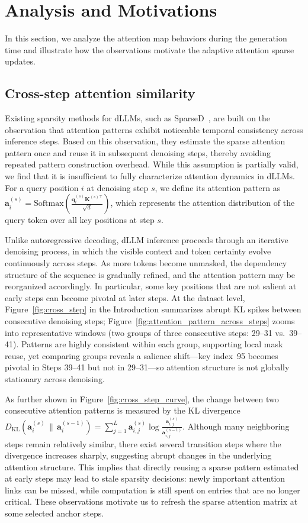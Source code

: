 \section{Analysis and Motivations}
\label{sec:analysis}
In this section, we analyze the attention map behaviors during the generation time and illustrate how the observations motivate the adaptive attention sparse updates.

\subsection{Cross-step attention similarity}
Existing sparsity methods for dLLMs, such as SparseD~\citep{wang2025sparsed}, are built on the observation that attention patterns exhibit noticeable temporal consistency across inference steps. Based on this observation, they estimate the sparse attention pattern once and reuse it in subsequent denoising steps, thereby avoiding repeated pattern construction overhead. While this assumption is partially valid, we find that it is insufficient to fully characterize attention dynamics in dLLMs. For a query position $i$ at denoising step $s$, we define its attention pattern as $\mathbf{a}_i^{(s)}=\mathrm{Softmax}\left(\frac{\mathbf{q}_i^{(s)}\mathbf{K}^{(s)\top}}{\sqrt{d}}\right)$, which represents the attention distribution of the query token over all key positions at step $s$.

Unlike autoregressive decoding, dLLM inference proceeds through an iterative denoising process, in which the visible context and token certainty evolve continuously across steps. As more tokens become unmasked, the dependency structure of the sequence is gradually refined, and the attention pattern may be reorganized accordingly. In particular, some key positions that are not salient at early steps can become pivotal at later steps. At the dataset level, Figure~\ref{fig:cross_step} in the Introduction summarizes abrupt KL spikes between consecutive denoising steps; Figure~\ref{fig:attention_pattern_across_steps} zooms into representative windows (two groups of three consecutive steps: 29--31 vs.\ 39--41). Patterns are highly consistent within each group, supporting local mask reuse, yet comparing groups reveals a salience shift---key index~95 becomes pivotal in Steps 39--41 but not in 29--31---so attention structure is not globally stationary across denoising.

As further shown in Figure~\ref{fig:cross_step_curve}, the change between two consecutive attention patterns is measured by the KL divergence $D_{\mathrm{KL}}\!\left(\mathbf{a}_i^{(s)} \,\|\, \mathbf{a}_i^{(s-1)}\right)=\sum_{j=1}^{L}\mathbf{a}_{i,j}^{(s)}\log\frac{\mathbf{a}_{i,j}^{(s)}}{\mathbf{a}_{i,j}^{(s-1)}}$. Although many neighboring steps remain relatively similar, there exist several transition steps where the divergence increases sharply, suggesting abrupt changes in the underlying attention structure. This implies that directly reusing a sparse pattern estimated at early steps may lead to stale sparsity decisions: newly important attention links can be missed, while computation is still spent on entries that are no longer critical. These observations motivate us to refresh the sparse attention matrix at some selected anchor steps.

